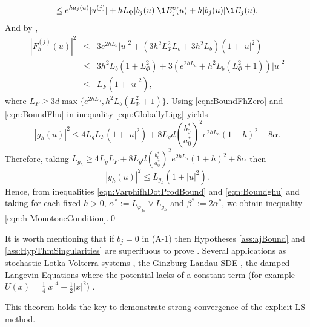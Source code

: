 \begin{pf}
\begin{dmath*}
			\leq
			e^{h a_j(u)} |u^{(j)}| +
			h L_{\Phi} |b_j(u)| \1{E_j^c}(u) +h |b_j(u)| \1{E_j}(u).
	\end{dmath*}
	 And by ,
	\begin{eqnarray}
		|F_h^{(j)}(u)|^2 
		&\leq&
			3 e^{2h L_a }|u|^2 + (3 h^2 L_{\Phi}^2 L_b + 3h^ 2L_b) (1+|u|^2) \nonumber\\
		&\leq&
			3 h^2 L_b (1 + L_{\Phi}^2)   +
			3 \left(
				 e^{2 h L_a} + h^2 L_b (L_{\Phi}^2 + 1 ) 
			\right)|u|^2 \nonumber\\ &\leq& L_F(1+|u|^2), \label{eqn:BoundFhu}
	\end{eqnarray}
	where
	$L_F\geq 3 d \max\{e^{2h L_a},  h^2 L_b(L_{\Phi}^2+1)\}$.
	Using \eqref{eqn:BoundFhZero} and \eqref{eqn:BoundFhu} in  inequality \eqref{eqn:GloballyLipg} yields
	\begin{equation*}
		|g_h(u)|^2 \leq
			4 L_g L_F(1+|u|^2)
			+ 8 L_g d
			\left(
				\frac{b_0^*}{a_0^*}
			\right)^2
			e^{2h L_a} (1+h)^2
			+8 \alpha.
	\end{equation*}
	Therefore, taking
	$
		 L_{g_h} 
		 \geq 
			  4 L_g L_F + 8 L_g d
			  \left(
				  \frac{b_0^*}{a_0^*}
			  \right)^2
			  e^{2h L_a} (1+h)^2
			  +8 \alpha		  
	$
	then
	\begin{equation}\label{eqn:Boundghu}
		|g_h(u)|^2
		\leq
			L_{g_h}(1+|u|^2).		
	\end{equation}
	Hence, from inequalities \eqref{eqn:VarphifhDotProdBound} and \eqref{eqn:Boundghu} 
	and taking for each fixed $h>0$, $\alpha^* := L_{\varphi_{f_h}}\vee L_{g_h}$ and
	$\beta^* := 2\alpha^*$, we obtain inequality  \eqref{eqn:h-MonotoneCondition}.\qed
\end{pf}
%
\begin{remark}\label{rmk:PertrubedSDE}
	It is worth mentioning that if $b_j=0$ in (A-1) 
	then Hypotheses \ref{ass:ajBound} and \ref{ass:HypThmSingularities} are superfluous to 
	prove . Several  applications  as  stochastic
	Lotka-Volterra systems \cite{Mao2002,Mao2003},  
	the Ginzburg-Landau SDE \cite[Sec. 4.4]{Kloeden1992},
	the damped Langevin Equations where the potential lacks of a constant term 
	(for example $U(x) = \frac{1}{4}|x|^4 - \frac{1}{2}|x|^2$) \cite{Hutzenthaler2012a}.
\end{remark}

This theorem holds the key to demonstrate strong convergence of the explicit LS method. 


